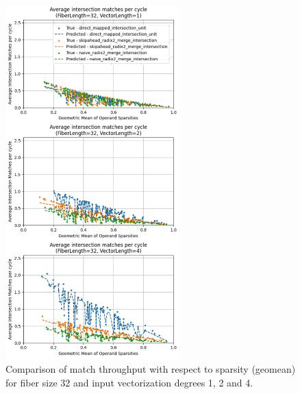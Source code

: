 \begin{figure}[H]
    \centering
    \includegraphics[width=0.6\textwidth]{figures/isect_model_fl32_vl1.pdf}
    \caption{Comparison of match throughput with respect to sparsity (geomean) for fiber size 32 and input vectorization degrees 1, 2 and 4.}
    \label{fig:isect_model_fl32_vl1}
\end{figure}

\clearpage